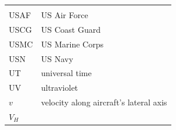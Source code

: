 \documentclass[
]{book}
\begin{document}
\begin{longtable}[]{@{}ll@{}}
\begin{minipage}[t]{0.47\columnwidth}
\end{minipage}\tabularnewline
\begin{minipage}[t]{0.47\columnwidth}\raggedright
USAF\strut
\end{minipage} & \begin{minipage}[t]{0.47\columnwidth}\raggedright
US Air Force\strut
\end{minipage}\tabularnewline
\begin{minipage}[t]{0.47\columnwidth}\raggedright
USCG\strut
\end{minipage} & \begin{minipage}[t]{0.47\columnwidth}\raggedright
US Coast Guard\strut
\end{minipage}\tabularnewline
\begin{minipage}[t]{0.47\columnwidth}\raggedright
USMC\strut
\end{minipage} & \begin{minipage}[t]{0.47\columnwidth}\raggedright
US Marine Corps\strut
\end{minipage}\tabularnewline
\begin{minipage}[t]{0.47\columnwidth}\raggedright
USN\strut
\end{minipage} & \begin{minipage}[t]{0.47\columnwidth}\raggedright
US Navy\strut
\end{minipage}\tabularnewline
\begin{minipage}[t]{0.47\columnwidth}\raggedright
UT\strut
\end{minipage} & \begin{minipage}[t]{0.47\columnwidth}\raggedright
universal time\strut
\end{minipage}\tabularnewline
\begin{minipage}[t]{0.47\columnwidth}\raggedright
UV\strut
\end{minipage} & \begin{minipage}[t]{0.47\columnwidth}\raggedright
ultraviolet\strut
\end{minipage}\tabularnewline
\begin{minipage}[t]{0.47\columnwidth}\raggedright
\(v\)\strut
\end{minipage} & \begin{minipage}[t]{0.47\columnwidth}\raggedright
velocity along aircraft's lateral axis\strut
\end{minipage}\tabularnewline
\begin{minipage}[t]{0.47\columnwidth}\raggedright
\(V_H\)\strut
\end{minipage} & \begin{minipage}[t]{0.47\columnwidth}\raggedright

\end{minipage}
\end{longtable}
\end{document}
